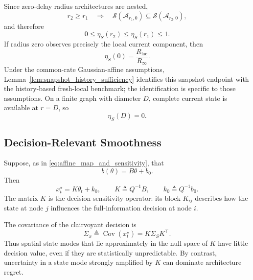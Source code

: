 \documentclass[11pt]{article}
\begin{document}
Since zero-delay radius architectures are nested,
\begin{equation}
    r_2\ge r_1
    \quad\Longrightarrow\quad
    \mathcal{S}(\mathcal{A}_{r_1,0})
    \subseteq
    \mathcal{S}(\mathcal{A}_{r_2,0}),
    \label{eq:radius_architecture_nested}
\end{equation}
and therefore
\begin{equation}
    0
    \le
    \eta_S(r_2)
    \le
    \eta_S(r_1)
    \le
    1.
    \label{eq:eta_S_monotone}
\end{equation}
If radius zero observes precisely the local current component, then
\begin{equation}
    \eta_S(0)
    =
    \frac{R_{\mathrm{loc}}}{R_\infty}.
    \label{eq:eta_S_zero}
\end{equation}
Under the common-rate Gaussian-affine assumptions,
Lemma~\ref{lem:snapshot_history_sufficiency} identifies this snapshot endpoint
with the history-based fresh-local benchmark; the identification is specific
to those assumptions.
On a finite graph with diameter $D$, complete current state is available at
$r=D$, so
\begin{equation}
    \eta_S(D)=0.
    \label{eq:eta_S_diameter}
\end{equation}

\subsection{Decision-Relevant Smoothness}
\label{subsec:decision_relevant_smoothness}

Suppose, as in \eqref{eq:affine_map_and_sensitivity}, that
\begin{equation}
    b(\theta)
    =
    B\theta+b_0.
    \label{eq:affine_b_spatial}
\end{equation}
Then
\begin{equation}
    x_t^\star
    =
    K\theta_t+k_0,
    \qquad
    K\triangleq Q^{-1}B,
    \qquad
    k_0\triangleq Q^{-1}b_0.
    \label{eq:decision_sensitivity_operator}
\end{equation}
The matrix $K$ is the decision-sensitivity operator: its block $K_{ij}$
describes how the state at node $j$ influences the full-information decision
at node $i$.

The covariance of the clairvoyant decision is
\begin{equation}
    \Sigma_x
    \triangleq
    \operatorname{Cov}(x_t^\star)
    =
    K\Sigma_S K^\top.
    \label{eq:decision_covariance}
\end{equation}
Thus spatial state modes that lie approximately in the null space of $K$ have
little decision value, even if they are statistically unpredictable. By
contrast, uncertainty in a state mode strongly amplified by $K$ can dominate
architecture regret.
\end{document}
